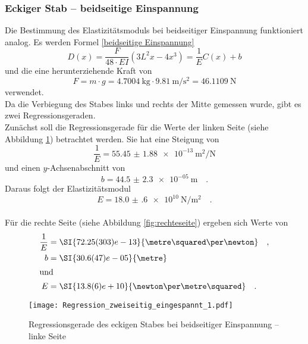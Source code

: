 \subsubsection{Eckiger Stab -- beidseitige Einspannung}
Die Bestimmung des Elastizitätsmoduls bei beidseitiger Einspannung funktioniert analog. Es werden Formel \eqref{beidseitige Einspannung}
\begin{equation*}
	D(x) = \frac{F}{48\cdot E I}\left(3L^2x-4x^3\right) = \frac{1}{E}C(x)+b
\end{equation*}
und die eine herunterziehende Kraft von
\begin{equation}
  F = m \cdot g = \SI{4.7004}{\kilo\gram} \cdot \SI{9.81}{\metre\per\second\squared} = \SI{46.1109}{\newton}
\end{equation}
verwendet. \\
Da die Verbiegung des Stabes links und rechts der Mitte gemessen wurde, gibt es zwei Regressionsgeraden. \\
Zunächst soll die Regressionsgerade für die Werte der linken Seite (siehe Abbildung \ref{fig:linkeseite}) betrachtet werden. Sie hat eine Steigung von
\begin{equation}
  \frac{1}{E}= \SI{55.45(188)e-13}{\metre\squared\per\newton}
\end{equation}
und einen $y$-Achsenabschnitt von
\begin{equation}
  b = \SI{44.5(23)e-05}{\metre} \quad.
\end{equation}
Daraus folgt der Elastizitätsmodul
\begin{equation}
  E = \SI{18.0(6)e+10}{\newton\per\metre\squared} \quad.
\end{equation}
\\
Für die rechte Seite (siehe Abbildung \ref{fig:rechteseite}) ergeben sich Werte von
\begin{align}
  \frac{1}{E} &= \SI{72.25(303)e-13}{\metre\squared\per\newton} \quad,\\
  b &= \SI{30.6(47)e-05}{\metre} \\
  \intertext{und}
  E &= \SI{13.8(6)e+10}{\newton\per\metre\squared} \quad.
\end{align}


\begin{figure}[h!]
\centering
\texttt{[image: Regression\_zweiseitig\_eingespannt\_1.pdf]}
\caption{Regressionsgerade des eckigen Stabes bei beidseitiger Einspannung -- linke Seite}
\label{fig:linkeseite}
\end{figure}

